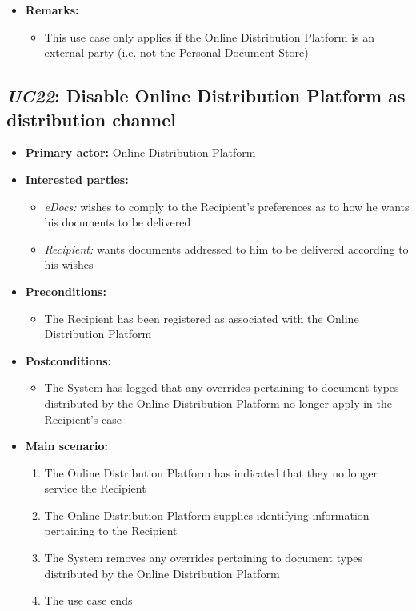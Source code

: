 \documentclass[a4paper,10pt]{article}
\begin{document}
\begin{itemize}
	\item \textbf{Remarks:}
	\begin{itemize}
		\item This use case only applies if the Online Distribution Platform is an external party (i.e. not the Personal Document Store)
	\end{itemize}
\end{itemize}

\subsection{\emph{UC22}: Disable Online Distribution Platform as distribution channel}
\begin{itemize}
	\item \textbf{Primary actor:} Online Distribution Platform
	\item \textbf{Interested parties:} 
	\begin{itemize}
		\item \textit{eDocs:} wishes to comply to the Recipient's preferences as to how he wants his documents to be delivered
		\item \textit{Recipient:} wants documents addressed to him to be delivered according to his wishes
	\end{itemize}
	
	\item \textbf{Preconditions:}
	\begin{itemize}
		\item The Recipient has been registered as associated with the Online Distribution Platform
	\end{itemize}
	
	\item \textbf{Postconditions:}
	\begin{itemize}
		\item The System has logged that any overrides pertaining to document types distributed by the Online Distribution Platform no longer apply in the Recipient's case
	\end{itemize}
	
	\item \textbf{Main scenario:} 
	\begin{enumerate}
		\item The Online Distribution Platform has indicated that they no longer service the Recipient
		\item The Online Distribution Platform supplies identifying information pertaining to the Recipient
		\item The System removes any overrides pertaining to document types distributed by the Online Distribution Platform
		\item The use case ends
	\end{enumerate}
	

\end{itemize}
\end{document}
